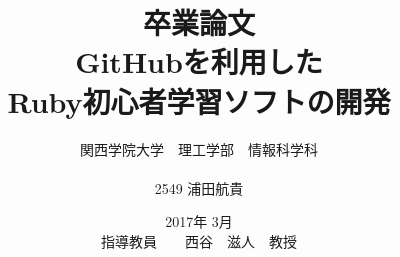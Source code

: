 \title{卒業論文\\
\vspace{4cm} GitHubを利用した\\Ruby初心者学習ソフトの開発}
\author{ 関西学院大学　理工学部　情報科学科\\\\2549 浦田航貴}
\date{\vspace{3cm} 2017年  3月\\
\vspace{3cm} 指導教員　　西谷　滋人　教授}
\maketitle
\tableofcontents

